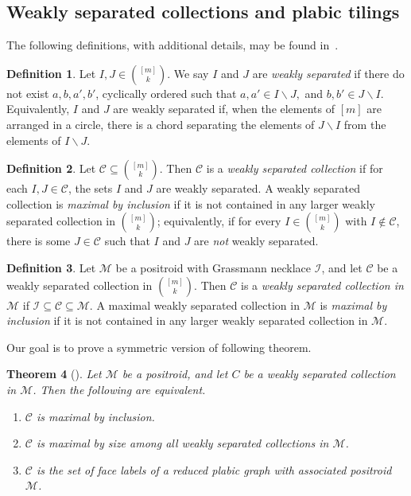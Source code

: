 \documentclass[10pt]{amsart}
\newtheorem{theo}{Theorem}[section]
\theoremstyle{definition}
\newtheorem{defi}[theo]{Definition}
\begin{document}
\subsection{Weakly separated collections and plabic tilings}

The following definitions, with additional details, may be found in~\cite{OPS15}.

\begin{defi}
Let $I, J \in \binom{[m]}{k}$.
We say $I$ and $J$ are \emph{weakly separated} if there do not exist $a,b,a',b'$, cyclically ordered such that $a,a' \in I \backslash J,$ and $b, b' \in J \backslash I$. Equivalently, $I$ and $J$ are weakly separated if, when the elements of $[m]$ are arranged in a circle, there is a chord separating the elements of $J \backslash I$ from the elements of $I \backslash J$.
\end{defi}

\begin{defi}Let $\mathcal{C} \subseteq \binom{[m]}{k}$. Then $\mathcal{C}$ is a \emph{weakly separated collection} if for each $I, J \in \mathcal{C}$, the sets $I$ and $J$ are weakly separated. A weakly separated collection is \emph{maximal by inclusion} if it is not contained in any larger weakly separated collection in $\binom{[m]}{k}$; equivalently, if for every $I \in \binom{[m]}{k}$ with $I \not\in \mathcal{C}$, there is some $J \in \mathcal{C}$ such that $I$ and $J$ are \emph{not} weakly separated.
\end{defi}

\begin{defi}
Let $\mathcal{M}$ be a positroid with Grassmann necklace $\mathcal{I}$, and let $\mathcal{C}$ be a weakly separated collection in $\binom{[m]}{k}$. Then $\mathcal{C}$ is a \emph{weakly separated collection in $\mathcal{M}$} if $\mathcal{I} \subseteq \mathcal{C} \subseteq \mathcal{M}$. A maximal weakly separated collection in $\mathcal{M}$ is \emph{maximal by inclusion} if it is not contained in any larger weakly separated collection in $\mathcal{M}$.
\end{defi}


Our goal is to prove a symmetric version of following theorem.

\begin{theo}[\cite{OPS15}]
\label{ops_main}
Let $\mathcal{M}$ be a positroid, and let $C$ be a weakly separated collection in $\mathcal{M}$. Then the following are equivalent.
\begin{enumerate}%
\item $\mathcal{C}$ is maximal by inclusion.
\item $\mathcal{C}$ is maximal by size among all weakly separated collections in $\mathcal{M}$.
\item $\mathcal{C}$ is the set of face labels of a reduced plabic graph with associated positroid~$\mathcal{M}$.
\end{enumerate}
\end{theo}
\end{document}
